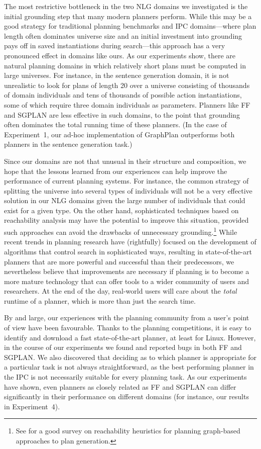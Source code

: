 The most restrictive bottleneck in the two NLG domains we investigated is
the initial grounding step that many modern planners perform. While this
may be a good strategy for traditional planning benchmarks and IPC
domains---where plan length often dominates universe size and an initial
investment into grounding pays off in saved instantiations during
search---this approach has a very pronounced effect in domains like ours.
As our experiments show, there are natural planning domains in which
relatively short plans must be computed in large universes. For instance,
in the sentence generation domain, it is not unrealistic to look for plans
of length 20 over a universe consisting of thousands of domain individuals
and tens of thousands of possible action instantiations, some of which
require three domain individuals as parameters. Planners like FF and SGPLAN
are less effective in such domains, to the point that grounding
often dominates the total running time of these planners. (In the case of
Experiment~1, our ad-hoc implementation of GraphPlan outperforms both
planners in the sentence generation task.)

Since our domains are not that unusual in their structure and composition,
we hope that the lessons learned from our experiences can help improve the
performance of current planning systems. For instance, the common strategy
of splitting the universe into several types of individuals will not be a
very effective solution in our NLG domains given the large number of
individuals that could exist for a given type. On the other hand,
sophisticated techniques based on reachability analysis may have the
potential to improve this situation, provided such approaches can avoid the
drawbacks of unnecessary grounding.\footnote{See
  \citep{Bryce:07} for a good survey on reachability heuristics for planning
  graph-based approaches to plan generation.}
While recent trends in planning research have (rightfully) focused on the
development of algorithms that control search in sophisticated ways,
resulting in state-of-the-art planners that are more powerful and
successful than their predecessors, we nevertheless believe that
improvements are necessary if planning is to become a more mature
technology that can offer tools to a wider community of users and
researchers. At the end of the day, real-world users will care about the
\emph{total} runtime of a planner, which is more than just the search time.

By and large, our experiences with the planning community from a user's
point of view have been favourable. Thanks to the planning competitions, it
is easy to identify and download a fast state-of-the-art planner, at least
for Linux. However, in the course of our experiments we found and reported
bugs in both FF and SGPLAN. We also discovered that deciding as to which
planner is appropriate for a particular task is not always straightforward,
as the best performing planner in the IPC is not necessarily suitable for
every planning task. As our experiments have shown, even planners as
closely related as FF and SGPLAN can differ significantly in their
performance on different domains (for instance, our results in
Experiment~4).



